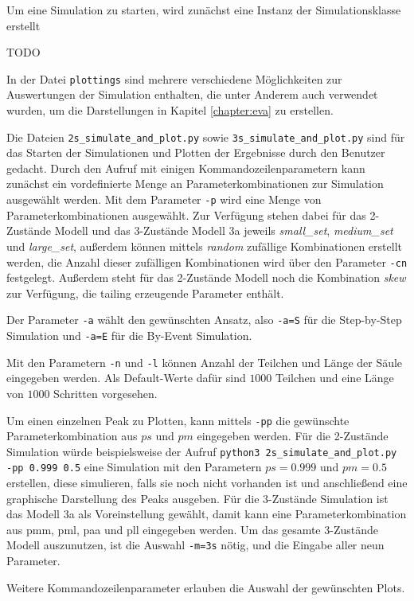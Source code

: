 Um eine Simulation zu starten, wird zunächst eine Instanz der Simulationsklasse erstellt

TODO

In der Datei \texttt{plottings} sind mehrere verschiedene Möglichkeiten zur Auswertungen der Simulation enthalten, die unter Anderem auch verwendet wurden, um die Darstellungen in Kapitel \ref{chapter:eva} zu erstellen. 

Die Dateien \verb!2s_simulate_and_plot.py! sowie  \verb!3s_simulate_and_plot.py! sind für das Starten der Simulationen und Plotten der Ergebnisse durch den Benutzer gedacht. Durch den Aufruf mit einigen Kommandozeilenparametern kann zunächst ein vordefinierte Menge an Parameterkombinationen zur Simulation ausgewählt werden. 
Mit dem Parameter \texttt{-p} wird eine Menge von Parameterkombinationen ausgewählt. Zur Verfügung stehen dabei für das 2-Zustände Modell und das 3-Zustände Modell 3a jeweils \textit{small\_set}, \textit{medium\_set} und \textit{large\_set}, außerdem können mittels \textit{random} zufällige Kombinationen erstellt werden, die Anzahl dieser zufälligen Kombinationen wird über den Parameter \texttt{-cn} festgelegt. Außerdem steht für das 2-Zustände Modell noch die Kombination \textit{skew} zur Verfügung, die tailing erzeugende Parameter enthält.

Der Parameter \texttt{-a} wählt den gewünschten Ansatz, also \texttt{-a=S} für die Step-by-Step Simulation und \texttt{-a=E} für die By-Event Simulation.

Mit den Parametern \texttt{-n} und \texttt{-l} können Anzahl der Teilchen und Länge der Säule eingegeben werden. Als Default-Werte dafür sind $1000$ Teilchen und eine Länge von $1000$ Schritten vorgesehen.

Um einen einzelnen Peak zu Plotten, kann mittels \texttt{-pp} die gewünschte Parameterkombination aus $ps$ und $pm$ eingegeben werden. Für die 2-Zustände Simulation würde beispielsweise der Aufruf \verb!python3 2s_simulate_and_plot.py -pp 0.999 0.5! eine Simulation mit den Parametern $ps = 0.999$ und $pm = 0.5$ erstellen, diese simulieren, falls sie noch nicht vorhanden ist und anschließend eine graphische Darstellung des Peaks ausgeben. 
Für die 3-Zustände Simulation ist das Modell 3a als Voreinstellung gewählt, damit kann eine Parameterkombination aus pmm, pml, paa und pll eingegeben werden. Um das gesamte 3-Zustände Modell auszunutzen, ist die Auswahl \texttt{-m=3s} nötig, und die Eingabe aller neun Parameter. 

Weitere Kommandozeilenparameter erlauben die Auswahl der gewünschten Plots.


